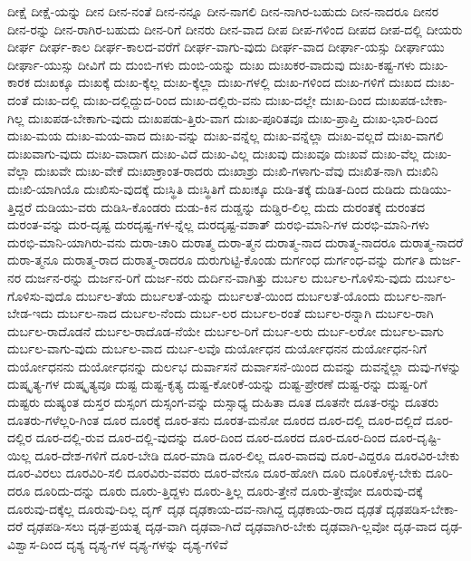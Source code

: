 {ದೀಕ್ಷೆ
ದೀಕ್ಷೆ-ಯನ್ನು
ದೀನ
ದೀನ-ನಂತೆ
ದೀನ-ನನ್ನೂ
ದೀನ-ನಾಗಲಿ
ದೀನ-ನಾಗಿರ-ಬಹುದು
ದೀನ-ನಾದರೂ
ದೀನರ
ದೀನ-ರನ್ನು
ದೀನ-ರಾಗಿರ-ಬಹುದು
ದೀನ-ರಿಗೆ
ದೀನರು
ದೀನ-ವಾದ
ದೀಪ
ದೀಪ-ಗಳಿಂದ
ದೀಪದ
ದೀಪ-ದಲ್ಲಿ
ದೀಯರು
ದೀರ್ಘ
ದೀರ್ಘ-ಕಾಲ
ದೀರ್ಘ-ಕಾಲದ-ವರೆಗೆ
ದೀರ್ಘ-ವಾಗು-ವುದು
ದೀರ್ಘ-ವಾದ
ದೀರ್ಘಾ-ಯಸ್ಸು
ದೀರ್ಘಾಯು
ದೀರ್ಘಾ-ಯುಸ್ಸು
ದೀವಿಗೆ
ದು
ದುಂಬಿ-ಗಳು
ದುಂಬಿ-ಯನ್ನು
ದುಃಖ
ದುಃಖಕರ-ವಾದುವು
ದುಃಖ-ಕಷ್ಟ-ಗಳು
ದುಃಖ-ಕಾರಕ
ದುಃಖಕ್ಕೂ
ದುಃಖಕ್ಕೆ
ದುಃಖ-ಕ್ಕೆಲ್ಲ
ದುಃಖ-ಕ್ಕೆಲ್ಲಾ
ದುಃಖ-ಗಳಲ್ಲಿ
ದುಃಖ-ಗಳಿಂದ
ದುಃಖ-ಗಳಿಗೆ
ದುಃಖದ
ದುಃಖ-ದಂತೆ
ದುಃಖ-ದಲ್ಲಿ
ದುಃಖ-ದಲ್ಲಿದ್ದುದ-ರಿಂದ
ದುಃಖ-ದಲ್ಲಿರು-ವನು
ದುಃಖ-ದಲ್ಲೇ
ದುಃಖ-ದಿಂದ
ದುಃಖಪಡ-ಬೇಕಾ-ಗಿಲ್ಲ
ದುಃಖಪಡ-ಬೇಕಾಗು-ವುದು
ದುಃಖಪಡು-ತ್ತಿರು-ವಾಗ
ದುಃಖ-ಪೂರಿತವೂ
ದುಃಖ-ಪ್ರಾಪ್ತಿ
ದುಃಖ-ಭಾರ-ದಿಂದ
ದುಃಖ-ಮಯ
ದುಃಖ-ಮಯ-ವಾದ
ದುಃಖ-ವನ್ನು
ದುಃಖ-ವನ್ನೆಲ್ಲ
ದುಃಖ-ವನ್ನೆಲ್ಲಾ
ದುಃಖ-ವಲ್ಲದೆ
ದುಃಖ-ವಾಗಲಿ
ದುಃಖವಾಗು-ವುದು
ದುಃಖ-ವಾದಾಗ
ದುಃಖ-ವಿದೆ
ದುಃಖ-ವಿಲ್ಲ
ದುಃಖವು
ದುಃಖವೂ
ದುಃಖವೆ
ದುಃಖ-ವೆಲ್ಲ
ದುಃಖ-ವೆಲ್ಲಾ
ದುಃಖವೇ
ದುಃಖ-ವೇಕೆ
ದುಃಖಾಕ್ರಾಂತ-ರಾದರು
ದುಃಖಾಶ್ರು
ದುಃಖಿ-ಗಳಾಗು-ವೆವು
ದುಃಖಿತ-ನಾಗಿ
ದುಃಖಿನಿ
ದುಃಖಿ-ಯಾಗಿಯೊ
ದುಃಖಿಸು-ವುದಕ್ಕೆ
ದುಃಸ್ಥಿತಿ
ದುಃಸ್ಥಿತಿಗೆ
ದುಖಃಕ್ಕೂ
ದುಡಿ-ತಕ್ಕೆ
ದುಡಿತ-ದಿಂದ
ದುಡಿದು
ದುಡಿಯು-ತ್ತಿದ್ದರೆ
ದುಡಿಯು-ವರು
ದುಡಿಸಿ-ಕೊಂಡರು
ದುಡು-ಕಿನ
ದುಡ್ಡನ್ನು
ದುಡ್ಡಿರ-ಲಿಲ್ಲ
ದುದು
ದುರಂತಕ್ಕೆ
ದುರಂತದ
ದುರಂತ-ವನ್ನು
ದುರ-ದೃಷ್ಟ
ದುರದೃಷ್ಟ-ಗಳ-ನ್ನೆಲ್ಲ
ದುರದೃಷ್ಟ-ವಶಾತ್
ದುರಭಿ-ಮಾನಿ-ಗಳ
ದುರಭಿ-ಮಾನಿ-ಗಳು
ದುರಭಿ-ಮಾನಿ-ಯಾಗಿರು-ವನು
ದುರಾ-ಚಾರಿ
ದುರಾತ್ಮ
ದುರಾ-ತ್ಮನ
ದುರಾತ್ಮ-ನಾದ
ದುರಾತ್ಮ-ನಾದರೂ
ದುರಾತ್ಮ-ನಾದರೆ
ದುರಾ-ತ್ಮನೂ
ದುರಾತ್ಮ-ರಾದ
ದುರಾತ್ಮ-ರಾದರೂ
ದುರುಗುಟ್ಟಿ-ಕೊಂಡು
ದುರ್ಗಂಧ
ದುರ್ಗಂಧ-ವನ್ನು
ದುರ್ಗತಿ
ದುರ್ಜ-ನರ
ದುರ್ಜನ-ರನ್ನು
ದುರ್ಜನ-ರಿಗೆ
ದುರ್ಜ-ನರು
ದುರ್ದಿನ-ವಾಗಿತ್ತು
ದುರ್ಬಲ
ದುರ್ಬಲ-ಗೊಳಿಸು-ವುದು
ದುರ್ಬಲ-ಗೊಳಿಸು-ವುದೊ
ದುರ್ಬಲ-ತೆಯ
ದುರ್ಬಲತೆ-ಯನ್ನು
ದುರ್ಬಲತೆ-ಯಿಂದ
ದುರ್ಬಲತೆ-ಯೊಂದು
ದುರ್ಬಲ-ನಾಗ-ಬೇಡ-ಇದು
ದುರ್ಬಲ-ನಾದ
ದುರ್ಬಲ-ನೆಂದು
ದುರ್ಬ-ಲರ
ದುರ್ಬಲ-ರಂತೆ
ದುರ್ಬಲ-ರನ್ನಾಗಿ
ದುರ್ಬಲ-ರಾಗಿ
ದುರ್ಬಲ-ರಾದೊಡನೆ
ದುರ್ಬಲ-ರಾದೊಡ-ನೆಯೇ
ದುರ್ಬಲ-ರಿಗೆ
ದುರ್ಬ-ಲರು
ದುರ್ಬ-ಲರೋ
ದುರ್ಬಲ-ವಾಗು
ದುರ್ಬಲ-ವಾಗು-ವುದು
ದುರ್ಬಲ-ವಾದ
ದುರ್ಬ-ಲವೊ
ದುರ್ಯೋಧನ
ದುರ್ಯೋಧನನ
ದುರ್ಯೋಧನ-ನಿಗೆ
ದುರ್ಯೋಧನನು
ದುರ್ಯೋಧನನ್ನು
ದುರ್ಲಭ
ದುರ್ವಾಸನೆ
ದುರ್ವಾಸನೆ-ಯಿಂದ
ದುವನ್ನು
ದುವನ್ನೆಲ್ಲಾ
ದುವು-ಗಳನ್ನು
ದುಷ್ಕೃತ್ಯ-ಗಳ
ದುಷ್ಕೃತ್ಯವೂ
ದುಷ್ಟ
ದುಷ್ಟ-ಕೃತ್ಯ
ದುಷ್ಟ-ಕೋರಿಕೆ-ಯನ್ನು
ದುಷ್ಟ-ಪ್ರೇರಣೆ
ದುಷ್ಟ-ರನ್ನು
ದುಷ್ಟ-ರಿಗೆ
ದುಷ್ಟರು
ದುಷ್ಯಂತ
ದುಸ್ತರ
ದುಸ್ಸಂಗ
ದುಸ್ಸಂಗ-ವನ್ನು
ದುಸ್ಸಾಧ್ಯ
ದುಹಿತಾ
ದೂತ
ದೂತನೇ
ದೂತ-ರನ್ನು
ದೂತರು
ದೂತರು-ಗಳೆಲ್ಲರಿ-ಗಿಂತ
ದೂರ
ದೂರಕ್ಕೆ
ದೂರ-ತನು
ದೂರತ-ಮನೋ
ದೂರದ
ದೂರ-ದಲ್ಲಿ
ದೂರ-ದಲ್ಲಿದೆ
ದೂರ-ದಲ್ಲಿರ
ದೂರ-ದಲ್ಲಿ-ರುವ
ದೂರ-ದಲ್ಲಿ-ವುದನ್ನು
ದೂರ-ದಿಂದ
ದೂರ-ದೂರದ
ದೂರ-ದೂರ-ದಿಂದ
ದೂರ-ದೃಷ್ಟಿ-ಯಿಲ್ಲ
ದೂರ-ದೇಶ-ಗಳಿಗೆ
ದೂರ-ಬೇಡಿ
ದೂರ-ಮಾಡಿ
ದೂರ-ಲಿಲ್ಲ
ದೂರ-ವಾದವು
ದೂರ-ವಿದ್ದರೂ
ದೂರವಿರ-ಬೇಕು
ದೂರ-ವಿರಲು
ದೂರವಿರಿ-ಸಲಿ
ದೂರವಿರು-ವವರು
ದೂರ-ವೇನೂ
ದೂರ-ಹೋಗಿ
ದೂರಿ
ದೂರಿಕೊಳ್ಳ-ಬೇಕು
ದೂರಿ-ದರೂ
ದೂರಿದು-ದನ್ನು
ದೂರು
ದೂರು-ತ್ತಿದ್ದಳು
ದೂರು-ತ್ತಿಲ್ಲ
ದೂರು-ತ್ತೇನೆ
ದೂರು-ತ್ತೇವೋ
ದೂರುವು-ದಕ್ಕೆ
ದೂರುವು-ದಕ್ಕೆಲ್ಲ
ದೂರುವು-ದಿಲ್ಲ
ದೃಗ್
ದೃಢ
ದೃಢಕಾಯ-ದವ-ನಾಗಿದ್ದ
ದೃಢಕಾಯ-ರಾದ
ದೃಢತೆ
ದೃಢಪಡಿಸ-ಬೇಕಾ-ದರೆ
ದೃಢಪಡಿ-ಸಲು
ದೃಢ-ಪ್ರಯತ್ನ
ದೃಢ-ವಾಗಿ
ದೃಢವಾ-ಗಿದೆ
ದೃಢವಾಗಿರ-ಬೇಕು
ದೃಢವಾಗಿ-ಲ್ಲವೋ
ದೃಢ-ವಾದ
ದೃಢ-ವಿಶ್ವಾಸ-ದಿಂದ
ದೃಶ್ಯ
ದೃಶ್ಯ-ಗಳ
ದೃಶ್ಯ-ಗಳನ್ನು
ದೃಶ್ಯ-ಗಳಿವೆ
}
